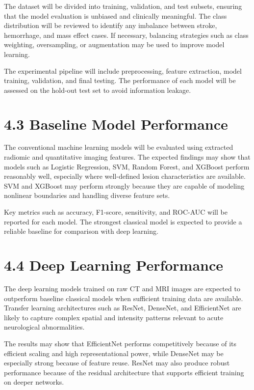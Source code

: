 \documentclass[12pt,a4paper]{report}
\begin{document}
The dataset will be divided into training, validation, and test subsets, ensuring that the model evaluation is unbiased and clinically meaningful. The class distribution will be reviewed to identify any imbalance between stroke, hemorrhage, and mass effect cases. If necessary, balancing strategies such as class weighting, oversampling, or augmentation may be used to improve model learning.

The experimental pipeline will include preprocessing, feature extraction, model training, validation, and final testing. The performance of each model will be assessed on the hold-out test set to avoid information leakage.

\section{4.3 Baseline Model Performance}

The conventional machine learning models will be evaluated using extracted radiomic and quantitative imaging features. The expected findings may show that models such as Logistic Regression, SVM, Random Forest, and XGBoost perform reasonably well, especially where well-defined lesion characteristics are available. SVM and XGBoost may perform strongly because they are capable of modeling nonlinear boundaries and handling diverse feature sets.

Key metrics such as accuracy, F1-score, sensitivity, and ROC-AUC will be reported for each model. The strongest classical model is expected to provide a reliable baseline for comparison with deep learning.

\section{4.4 Deep Learning Performance}

The deep learning models trained on raw CT and MRI images are expected to outperform baseline classical models when sufficient training data are available. Transfer learning architectures such as ResNet, DenseNet, and EfficientNet are likely to capture complex spatial and intensity patterns relevant to acute neurological abnormalities.

The results may show that EfficientNet performs competitively because of its efficient scaling and high representational power, while DenseNet may be especially strong because of feature reuse. ResNet may also produce robust performance because of the residual architecture that supports efficient training on deeper networks.
\end{document}
